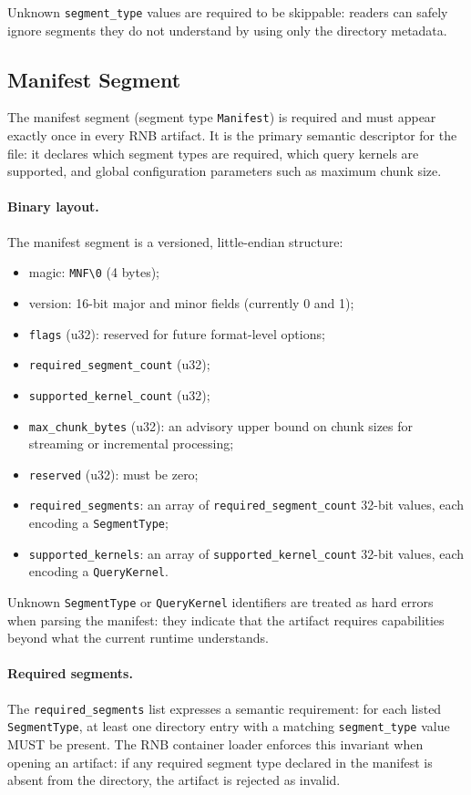 \documentclass[11pt]{article}
\begin{document}
Unknown \verb|segment_type| values are required to be skippable:
readers can safely ignore segments they do not understand by using
only the directory metadata.

\subsection{Manifest Segment}

The manifest segment (segment type \texttt{Manifest}) is required and
must appear exactly once in every RNB artifact. It is the primary
semantic descriptor for the file: it declares which segment types are
required, which query kernels are supported, and global configuration
parameters such as maximum chunk size.

\paragraph{Binary layout.}
The manifest segment is a versioned, little-endian structure:
\begin{itemize}
  \item magic: \verb|MNF\0| (4 bytes);
  \item version: 16-bit major and minor fields (currently 0 and 1);
  \item \verb|flags| (u32): reserved for future format-level options;
  \item \verb|required_segment_count| (u32);
  \item \verb|supported_kernel_count| (u32);
  \item \verb|max_chunk_bytes| (u32): an advisory upper bound on chunk
        sizes for streaming or incremental processing;
  \item \verb|reserved| (u32): must be zero;
  \item \verb|required_segments|: an array of
        \verb|required_segment_count| 32-bit values, each encoding a
        \texttt{SegmentType};
  \item \verb|supported_kernels|: an array of
        \verb|supported_kernel_count| 32-bit values, each encoding a
        \texttt{QueryKernel}.
\end{itemize}

Unknown \texttt{SegmentType} or \texttt{QueryKernel} identifiers are
treated as hard errors when parsing the manifest: they indicate that
the artifact requires capabilities beyond what the current runtime
understands.

\paragraph{Required segments.}
The \verb|required_segments| list expresses a semantic requirement:
for each listed \texttt{SegmentType}, at least one directory entry
with a matching \verb|segment_type| value MUST be present. The RNB
container loader enforces this invariant when opening an artifact: if
any required segment type declared in the manifest is absent from the
directory, the artifact is rejected as invalid.
\end{document}
